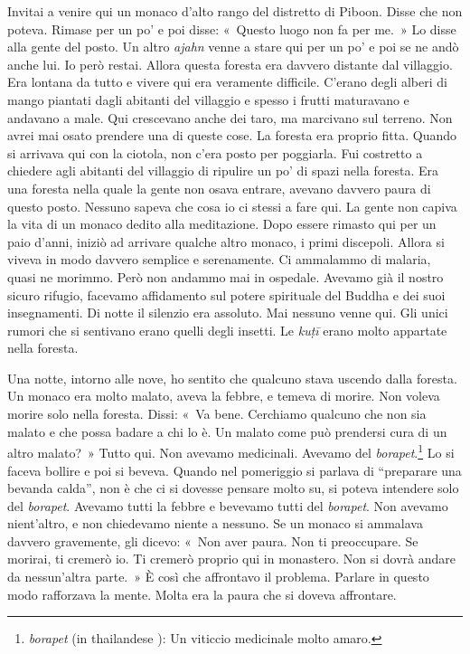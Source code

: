 Invitai a venire qui un monaco d'alto rango del distretto di Piboon.
Disse che non poteva. Rimase per un po' e poi disse: «~Questo luogo non
fa per me.~» Lo disse alla gente del posto. Un altro \emph{ajahn} venne
a stare qui per un po' e poi se ne andò anche lui. Io però restai.
Allora questa foresta era davvero distante dal villaggio. Era lontana da
tutto e vivere qui era veramente difficile. C'erano degli alberi di
mango piantati dagli abitanti del villaggio e spesso i frutti maturavano
e andavano a male. Qui crescevano anche dei taro, ma marcivano sul
terreno. Non avrei mai osato prendere una di queste cose. La foresta era
proprio fitta. Quando si arrivava qui con la ciotola, non c'era posto
per poggiarla. Fui costretto a chiedere agli abitanti del villaggio di
ripulire un po' di spazi nella foresta. Era una foresta nella quale la
gente non osava entrare, avevano davvero paura di questo posto. Nessuno
sapeva che cosa io ci stessi a fare qui. La gente non capiva la vita di
un monaco dedito alla meditazione. Dopo essere rimasto qui per un paio
d'anni, iniziò ad arrivare qualche altro monaco, i primi discepoli.
Allora si viveva in modo davvero semplice e serenamente. Ci ammalammo di
malaria, quasi ne morimmo. Però non andammo mai in ospedale. Avevamo già
il nostro sicuro rifugio, facevamo affidamento sul potere spirituale del
Buddha e dei suoi insegnamenti. Di notte il silenzio era assoluto. Mai
nessuno venne qui. Gli unici rumori che si sentivano erano quelli degli
insetti. Le \emph{kuṭī} erano molto appartate nella foresta.

Una notte, intorno alle nove, ho sentito che qualcuno stava uscendo
dalla foresta. Un monaco era molto malato, aveva la febbre, e temeva di
morire. Non voleva morire solo nella foresta. Dissi: «~Va bene.
Cerchiamo qualcuno che non sia malato e che possa badare a chi lo è. Un
malato come può prendersi cura di un altro malato?~» Tutto qui. Non
avevamo medicinali. Avevamo del \emph{borapet}.\footnote{\emph{borapet}
  (in thailandese ): Un viticcio medicinale molto amaro.} Lo si
faceva bollire e poi si beveva. Quando nel pomeriggio si parlava di
``preparare una bevanda calda'', non è che ci si dovesse pensare molto
su, si poteva intendere solo del \emph{borapet}. Avevamo tutti la febbre
e bevevamo tutti del \emph{borapet}. Non avevamo nient'altro, e non
chiedevamo niente a nessuno. Se un monaco si ammalava davvero
gravemente, gli dicevo: «~Non aver paura. Non ti preoccupare. Se
morirai, ti cremerò io. Ti cremerò proprio qui in monastero. Non si
dovrà andare da nessun'altra parte.~» È così che affrontavo il problema.
Parlare in questo modo rafforzava la mente. Molta era la paura che si
doveva affrontare.

